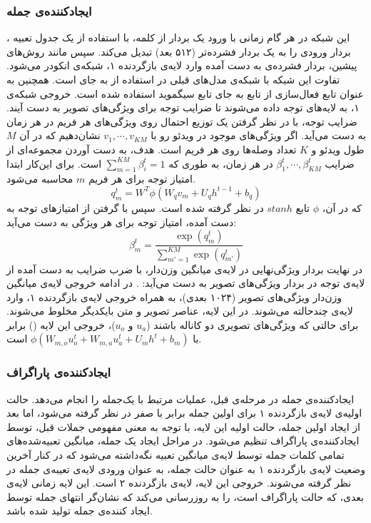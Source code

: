 \subsubsection{ایجاد‌کننده‌ی جمله}
این شبکه در هر گام زمانی با ورود یک بردار  از کلمه‌، با استفاده از یک جدول تعبیه
، بردار ورودی را به یک بردار فشرده‌تر (۵۱۲ بعد) تبدیل می‌کند. سپس مانند روش‌های پیشین، بردار فشرده‌ی به دست آمده وارد لایه‌ی بازگردنده ۱، شبکه‌ی انکودر می‌شود. تفاوت این شبکه با شبکه‌ی مدل‌های قبلی در استفاده از  به جای  است. همچنین به عنوان تابع فعال‌سازی از تابع   به جای تابع سیگموید استفاده شده است. خروجی شبکه‌ی ۱، به لایه‌های توجه   داده می‌شوند تا ضرایب توجه برای ویژگی‌های تصویر به دست آیند. ضرایب توجه، با در نظر گرفتن یک توزیع احتمال روی ویژگی‌های هر فریم در هر زمان به دست می‌آید. اگر ویژگی‌های موجود در ویدئو رو با 
$v_1, \cdots, v_{KM}$
نشان‌دهیم که در آن $M$ طول ویدئو و $K$ تعداد وصله‌ها  روی هر فریم است. هدف، به دست آوردن مجموعه‌ای از ضرایب 
$\beta^t_1, \cdots, \beta^t_{KM}$
در هر زمان، به طوری که 
$\sum_{m=1}^{KM} \beta_i^t = 1$
است. برای این‌کار ابتدا امتیاز توجه برای هر فریم $m$ محاسبه‌ می‌شود.
\begin{equation*}
	q_m^t = W^T \phi(W_qv_m +‌U_qh^{t-1} + b_q)
\end{equation*}
که در آن، $\phi$ تابع $stanh$ در نظر گرفته شده است. سپس با گرفتن  از امتیاز‌های توجه به دست آمده، امتیاز توجه برای هر ویژگی به دست می‌آید:
\begin{equation*}
		\beta^t_m = \frac{\exp(q_m^t)}{\sum_{m'=1}^{KM} \exp(q^t_{m'})}
\end{equation*}
در نهایت بردار ویژگی‌نهایی در لایه‌ی میانگین وزن‌دار، با ضرب ضرایب به دست آمده از لایه‌ی توجه در بردار ویژگی‌های تصویر به دست می‌آید: 
.
در ادامه خروجی لایه‌ی میانگین وزن‌دار ویژگی‌های تصویر (۱۰۲۴ بعدی)، به همراه خروجی لایه‌ی بازگردنده ۱، وارد لایه‌ی چند‌حالته می‌شوند. در این لایه، عناصر تصویر و متن بایکدیگر مخلوط می‌شوند. برای حالتی که ویژگی‌های تصویری دو کاناله باشند ($u_a$ و $u_o$)، خروجی این لایه () برابر با
$\phi(W_{m,o}u_o^t +‌W_{m,a}u_a^t +‌U_mh^t+b_m)$
 است.
\subsubsection{ایجاد‌کننده‌ی پاراگراف}
ایجاد‌کننده‌ی جمله در مرحله‌ی قبل، عملیات مرتبط با یک‌جمله را انجام می‌دهد. حالت اولیه‌ی لایه‌ی بازگردنده ۱ برای اولین جمله برابر با صفر در نظر گرفته می‌شود، اما بعد از ایجاد اولین جمله، حالت اولیه این لایه، با توجه به معنی مفهومی جملات قبل، توسط ایجاد‌کننده‌ی پاراگراف تنظیم می‌شود. در مراحل ایجاد یک جمله، میانگین تعبیه‌شده‌‌های تمامی کلمات جمله توسط لایه‌ی میانگین تعبیه 
نگه‌داشته می‌شود که در کنار آخرین وضعیت لایه‌ی بازگردنده ۱ به عنوان حالت جمله، به عنوان ورودی لایه‌ی تعیبه‌ی جمله 
در نظر گرفته می‌شوند. خروجی این لایه‌، لایه‌ی بازگردنده ۲ است. این لایه زمانی لایه‌ی بعدی، که حالت پاراگراف است، را به روز‌رسانی می‌کند که نشان‌گر انتهای جمله 
توسط ایجاد کنند‌ه‌ی جمله تولید شده باشد.
